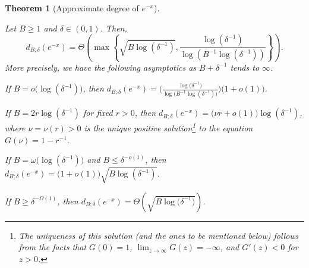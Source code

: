 \documentclass[10pt,a4paper]{article}
\theoremstyle{plain}\newtheorem{theorem}{Theorem}
\theoremstyle{definition}
\begin{document}
\begin{theorem}[Approximate degree of $e^{-x}$] 

\label{estimatedegree2}

Let $B \ge 1$ and $\delta \in (0, 1)$. Then, $$d_{B; \delta} (e^{-x}) = \Theta\left( \max \left\{ \sqrt{B \log(\delta^{-1})}, \frac{\log(\delta^{-1}) }{ \log(B^{-1} \log(\delta^{-1}))} \right\}\right).$$ More precisely, we have the following asymptotics as $B + \delta^{-1}$ tends to $\infty$. 


\begin{enumerate}


{\item If $B = o \big( \log ( \delta^{-1} ) \big)$, then $d_{B; \delta} (e^{-x})  =  \bigg( \displaystyle\frac{\log \big( \delta^{-1} \big)}{\log \big( B^{-1} \log (\delta^{-1}) \big)} \bigg) \big( 1 + o (1) \big)$.}

{\item If $B = 2 r \log ( \delta^{-1})$ for fixed $r > 0$, then $d_{B; \delta} (e^{-x}) = \big( \nu r + o(1) \big) \log (\delta^{-1})$, where $\nu = \nu (r) > 0$ is the unique positive solution\footnote{The uniqueness of this solution (and the ones to be mentioned below) follows from the facts that $G (0) = 1$, $\lim_{z \rightarrow \infty} G(z) = -\infty$, and $G' (z) < 0$ for $z > 0$.} to the equation $G (\nu) = 1 - r^{-1}$.}

{\item If $B = \omega \big( \log ( \delta^{-1} ) \big)$ and $B \le \delta^{-o(1)}$, then $d_{B; \delta} (e^{-x}) = \big( 1 + o(1) \big) \sqrt{B \log (\delta^{-1})}$.}

{\item If $B \ge \delta^{- \Omega (1)}$, then $d_{B; \delta} (e^{-x}) = \Theta \left( \sqrt{B \log \big( \delta^{-1} \big)} \right)$.}

\end{enumerate}

\end{theorem} 
\end{document}
